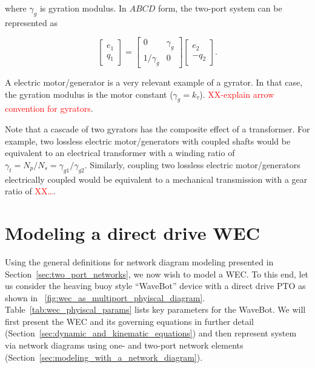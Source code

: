 \documentclass[lettersize,journal]{IEEEtran}
\newcommand{\rc}[1]{\textcolor{red}{#1}}
\begin{document}
\noindent{}where $\gamma_g$ is gyration modulus.
In $ABCD$ form, the two-port system can be represented as

\begin{equation}
        \begin{bmatrix}
                e_1 \\ q_1
        \end{bmatrix}
        =
        \begin{bmatrix}
                0 & \gamma_g \\ 1/\gamma_g & 0
        \end{bmatrix}
        \begin{bmatrix}
                e_2 \\ - q_2
        \end{bmatrix} .
        \label{eq:transformer_abcd}
\end{equation}

\noindent{}A electric motor/generator is a very relevant example of a gyrator.
In that case, the gyration modulus is the motor constant ($\gamma_g=k_\tau$).
\rc{XX-explain arrow convention for gyrators}.

Note that a cascade of two gyrators has the composite effect of a transformer.
For example, two lossless electric motor/generators with coupled shafts would be equivalent to an electrical transformer with a winding ratio of $\gamma_t=N_p/N_s=\gamma_{g1}/\gamma_{g2}$.
Similarly, coupling two lossless electric motor/generators electrically coupled would be equivalent to a mechanical transmission with a gear ratio of \rc{XX\dots{}}.


\section{Modeling a direct drive WEC}\label{sec:modeling_a_direct_drive_wec}
Using the general definitions for network diagram modeling presented in Section~\ref{sec:two_port_networks}, we now wish to model a WEC.
To this end, let us consider the heaving buoy style ``WaveBot'' device with a direct drive PTO as shown in \figurename~\ref{fig:wec_as_multiport_phyiscal_diagram}.
Table~\ref{tab:wec_phyiscal_params} lists key parameters for the WaveBot.
We will first present the WEC and its governing equations in further detail (Section~\ref{sec:dynamic_and_kinematic_equations}) and then represent system via network diagrams using one- and two-port network elements (Section~\ref{sec:modeling_with_a_network_diagram}).
\end{document}

